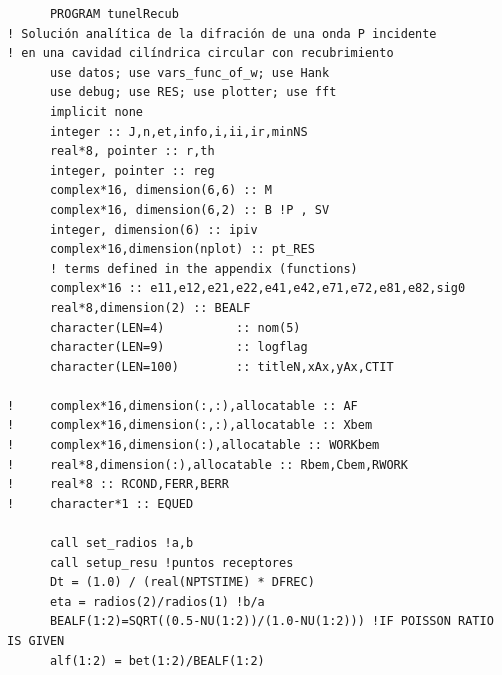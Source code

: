 \documentclass [11pt,spanish]{article}
\begin{document}
\begingroup
\fontsize{10pt}{12pt}
\selectfont
{}
\begin{shaded}
\begin{verbatim}
      PROGRAM tunelRecub
! Solución analítica de la difración de una onda P incidente 
! en una cavidad cilíndrica circular con recubrimiento
      use datos; use vars_func_of_w; use Hank
      use debug; use RES; use plotter; use fft
      implicit none
      integer :: J,n,et,info,i,ii,ir,minNS
      real*8, pointer :: r,th
      integer, pointer :: reg
      complex*16, dimension(6,6) :: M
      complex*16, dimension(6,2) :: B !P , SV
      integer, dimension(6) :: ipiv 
      complex*16,dimension(nplot) :: pt_RES
      ! terms defined in the appendix (functions)
      complex*16 :: e11,e12,e21,e22,e41,e42,e71,e72,e81,e82,sig0
      real*8,dimension(2) :: BEALF
      character(LEN=4)          :: nom(5)
      character(LEN=9)          :: logflag
      character(LEN=100)        :: titleN,xAx,yAx,CTIT
      
!     complex*16,dimension(:,:),allocatable :: AF
!     complex*16,dimension(:,:),allocatable :: Xbem
!     complex*16,dimension(:),allocatable :: WORKbem
!     real*8,dimension(:),allocatable :: Rbem,Cbem,RWORK
!     real*8 :: RCOND,FERR,BERR
!     character*1 :: EQUED
      
      call set_radios !a,b
      call setup_resu !puntos receptores
      Dt = (1.0) / (real(NPTSTIME) * DFREC)
      eta = radios(2)/radios(1) !b/a
      BEALF(1:2)=SQRT((0.5-NU(1:2))/(1.0-NU(1:2))) !IF POISSON RATIO IS GIVEN
      alf(1:2) = bet(1:2)/BEALF(1:2)
\end{verbatim}
\end{shaded}
\endgroup
\end{document}
